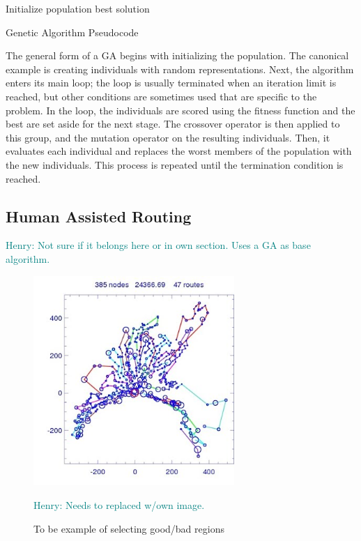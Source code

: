 \documentclass{sig-alternate}
\newcommand{\allcomments}[1]{{#1}}
\newcommand{\hfcomment}[1]{\textcolor{Teal}{\allcomments{Henry: {#1}}}}
\begin{document}
{\begin{algorithm}
Initialize population\;
\Return best solution\;
\caption{Genetic Algorithm Pseudocode\label{GA}}
\end{algorithm}

The general form of a GA begins with initializing the population. The canonical example is creating individuals with random representations. Next, the algorithm enters its main loop; the loop is usually terminated when an iteration limit is reached, but other conditions are sometimes used that are specific to the problem. In the loop, the individuals are scored using the fitness function and the best are set aside for the next stage. The crossover operator is then applied to this group, and the mutation operator on the resulting individuals. Then, it evaluates each individual and replaces the worst members of the population with the new individuals. This process is repeated until the termination condition is reached.

\subsection{Human Assisted Routing}
\label{sec:humans}
\hfcomment{Not sure if it belongs here or in own section. Uses a GA as base algorithm.}

\begin{figure}
\centering
\includegraphics[width=3in, keepaspectratio]{vrp2.jpg}
\caption{To be example of selecting good/bad regions}
\hfcomment{Needs to replaced w/own image.}
\label{fig:Humangraph}
\end{figure}

}
\end{document}
